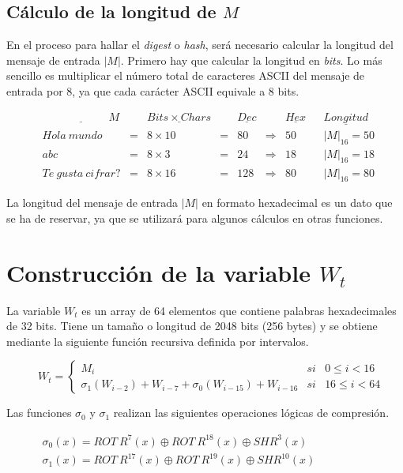 \documentclass{article}
\begin{document}
    \subsection{Cálculo de la longitud de $M$}
        En el proceso para hallar el \textit{digest} o \textit{hash}, será necesario calcular la longitud del mensaje de entrada $|M|$. Primero hay que calcular la longitud en \textit{bits}. Lo más sencillo es multiplicar el número total de caracteres ASCII del mensaje de entrada por 8, ya que cada carácter ASCII equivale a 8 bits.
            \begin{figure}[H]
            \centering
                $\begin{array}{rccclclcl}
                    \underline{\qquad \qquad \qquad M} & & \underline{Bits \times Chars} & & \underline{Dec} & & \underline{Hex} & & \underline{Longitud}\\
                    Hola \ mundo & = & 8 \times 10 & = & 80 & \Rightarrow & 50 & & |M|_{16} = 50 \\
                    abc & = & 8 \times 3 \ & = & 24 & \Rightarrow & 18 & & |M|_{16} = 18  \\
                    Te \ gusta \ cifrar? & = & 8 \times 16 & = & 128 & \Rightarrow & 80 & & |M|_{16} = 80
                \end{array}$
            \end{figure}
        La longitud del mensaje de entrada $|M|$ en formato hexadecimal es un dato que se ha de reservar, ya que se utilizará para algunos cálculos en otras funciones.

\section{Construcción de la variable $W_{t}$}
    La variable $W_{t}$ es un array de 64 elementos que contiene palabras hexadecimales de 32 bits. Tiene un tamaño o longitud de 2048 bits (256 bytes) y se obtiene mediante la siguiente función recursiva definida por intervalos.
        \begin{figure}[H]
        \centering
            $W_{t} = \left \{
            \begin{array}{lcl}
                M_{i} & si & 0 \le i < 16 \\
                \sigma_{1}(W_{i-2})+W_{i-7}+\sigma_{0}(W_{i-15})+W_{i-16} & si & 16 \le i < 64
            \end{array}
            \right .$
        \end{figure}
    Las funciones  $\sigma_{0}$ y $\sigma_{1}$ realizan las siguientes operaciones lógicas de compresión.
        \begin{figure}[H]
        \centering
            $\begin{array}{l}
                \sigma_{0}(x) = ROT \ R^{7}(x) \oplus ROT \ R^{18}(x) \oplus SHR^{3}(x) \\
                \sigma_{1}(x) = ROT \ R^{17}(x) \oplus ROT \ R^{19}(x) \oplus SHR^{10}(x)
            \end{array}$
        \end{figure}
    
\end{document}

